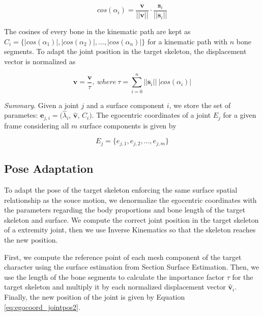 \documentclass{vgtc}
\begin{document}
\begin{equation}
\label{eq:contribution}
cos(\alpha_{i}) = \frac{\mathbf{v}}{||\mathbf{v}||}\cdot\frac{\mathbf{s}_{i}}{||\mathbf{s}_{i}||}
\end{equation}

The cosines of every bone in the kinematic path are kept as
\(C_{i} = \{|cos(\alpha_{1})|, |cos(\alpha_{2})|,..., |cos(\alpha_{n})|\}\)
for a kinematic path with \(n\) bone segments. To adapt the joint
position in the target skeleton, the displacement vector is normalized
as

\begin{equation}
\label{eq:tau}
\mathbf{\hat{v}} = \frac{\mathbf{v}}{\tau},\ where\ \tau = \sum_{i=0}^{n}||\mathbf{s}_{i}||\ |cos(\alpha_{i})|
\end{equation}

\emph{Summary}. Given a joint \(j\) and a surface component \(i\), we
store the set of parametes: \(\mathbf{e}_{j,i} = (\hat{\lambda}_{i}\),
\(\mathbf{\hat{v}}\), \(C_{i})\). The egocentric coordinates of a joint
\(E_{j}\) for a given frame considering all \(m\) surface components is
given by

\begin{equation}
\label{eq:egocoordsall}
E_{j} = \{e_{j,1}, e_{j,2},...,e_{j,m}\}
\end{equation}


    \subsection{Pose Adaptation}\label{pose-adaptation}

To adapt the pose of the target skeleton enforcing the same surface
spatial relationship as the souce motion, we denormalize the egocentric
coordinates with the parameters regarding the body proportions and bone
length of the target skeleton and surface. We compute the correct joint
position in the target skeleton of a extremity joint, then we use
Inverse Kinematics so that the skeleton reaches the new position.

First, we compute the reference point of each mesh component of the
target character using the surface estimation from Section Surface
Estimation. Then, we use the length of the bone segments to calculate
the importance factor \(\tau\) for the target skeleton and multiply it
by each normalized displacement vector \(\mathbf{\hat{v}}_{i}\).
Finally, the new position of the joint is given by Equation
\ref{eq:egocoord_jointpos2}.
\end{document}
